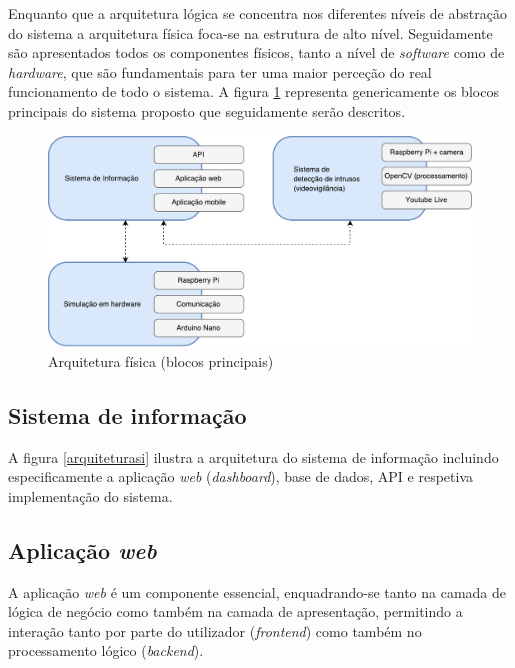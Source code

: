 Enquanto que a arquitetura lógica se concentra nos diferentes níveis de abstração do sistema a arquitetura física foca-se na estrutura de alto nível.  
Seguidamente são apresentados todos os componentes físicos, tanto  a nível de \textit{software} como de \textit{hardware}, que são fundamentais para ter uma maior perceção do real funcionamento de todo o sistema. 
A figura \ref{fisicablocos} representa genericamente os blocos principais do sistema proposto que seguidamente serão descritos. 


\begin{figure}[h]
	\centering
	\includegraphics[scale=0.51]{esquemas/esquema-blocos.pdf}
	\caption{Arquitetura física (blocos principais)}
	\label{fisicablocos}
\end{figure}


  
\subsection{Sistema de informação}




A figura \ref{arquiteturasi} ilustra a arquitetura do sistema de informação incluindo especificamente a aplicação \textit{web} (\textit{dashboard}), base de dados, \acs{API}   e respetiva implementação do sistema. 





\subsection{Aplicação \textit{web}}

A aplicação \textit{web} é um componente essencial, enquadrando-se tanto na camada de lógica de negócio como também na camada de apresentação, permitindo a interação tanto por parte do utilizador (\textit{frontend}) como também no processamento lógico (\textit{backend}).   

